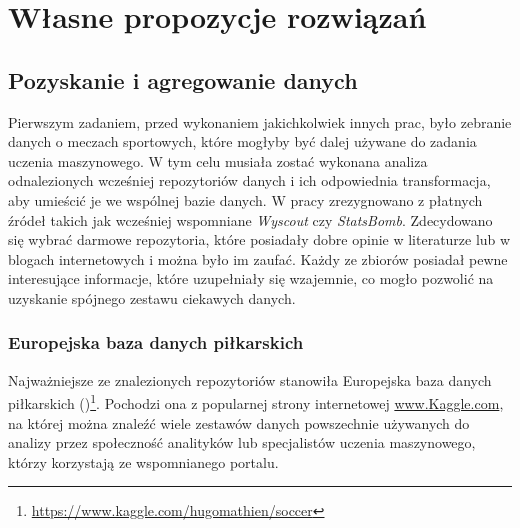 \chapter{Własne propozycje rozwiązań}
    \section{Pozyskanie i agregowanie danych} \label{data_aggregation}
    \noindent Pierwszym zadaniem, przed wykonaniem jakichkolwiek innych prac, było zebranie danych o meczach sportowych, które mogłyby być dalej używane do zadania uczenia maszynowego. W tym celu musiała zostać wykonana analiza odnalezionych wcześniej repozytoriów danych i ich odpowiednia transformacja, aby umieścić je we wspólnej bazie danych. W pracy zrezygnowano z płatnych źródeł takich jak wcześniej wspomniane \textit{Wyscout} czy \textit{StatsBomb}. Zdecydowano się wybrać darmowe repozytoria, które posiadały dobre opinie w literaturze lub w blogach internetowych i można było im zaufać. Każdy ze zbiorów posiadał pewne interesujące informacje, które uzupełniały się wzajemnie, co mogło pozwolić na uzyskanie spójnego zestawu ciekawych danych.
    
        \subsection{Europejska baza danych piłkarskich}
        \noindent Najważniejsze ze znalezionych repozytoriów stanowiła Europejska baza danych piłkarskich ()\footnote{\url{https://www.kaggle.com/hugomathien/soccer}}. Pochodzi ona z popularnej strony internetowej \url{www.Kaggle.com}, na której można znaleźć wiele zestawów danych powszechnie używanych do analizy przez społeczność analityków lub specjalistów uczenia maszynowego, którzy korzystają ze wspomnianego portalu. 
        
